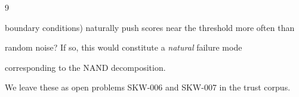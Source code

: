 \documentclass[11pt]{article}
\theoremstyle{definition}
\begin{document}
\begin{thebibliography}{9}
\begin{openproblem}
boundary conditions) naturally push scores near the threshold more often than






random noise?  If so, this would constitute a \emph{natural} failure mode






corresponding to the NAND decomposition.






\end{openproblem}













We leave these as open problems SKW-006 and SKW-007 in the trust corpus.































































\end{thebibliography}
\end{document}
